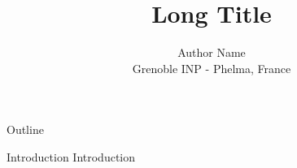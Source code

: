 \documentclass{beamer}
\author[@phelma.grenoble-inp.fr]{ Author Name \\
Grenoble INP - Phelma, France}
\title[Short Title]{Long Title}
\begin{document}
 
%
\frame{\titlepage}

%
\begin{frame}{Outline}
\tableofcontents
\end{frame}
%
\begin{frame}{Introduction}
    Introduction
\end{frame}
\end{document}
